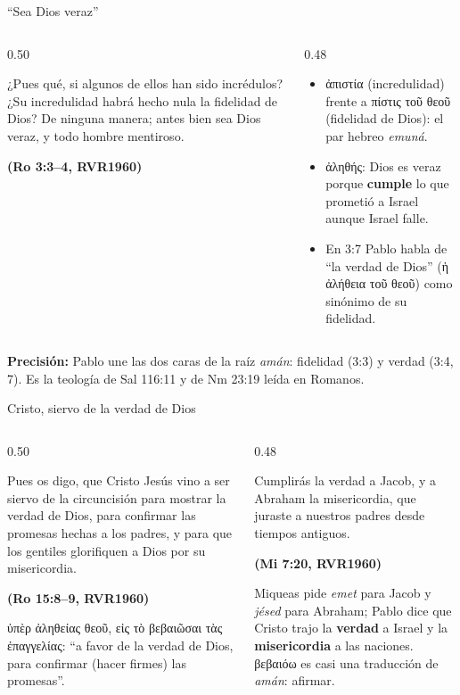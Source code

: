 \documentclass[hyperref={bookmarks=false},aspectratio=169]{beamer}
\newcommand{\grc}[1]{\foreignlanguage{ancientgreek}{#1}}
\newcommand{\fuente}[1]{\par\hfill{\upshape\bfseries\footnotesize\textcolor{azul}{#1}}}
\newcommand{\destacar}[1]{\textbf{\textcolor{azul}{#1}}}
\newcommand{\precision}[1]{{\footnotesize\color{gris}\textbf{Precisión:} #1}}
\begin{document}
\begin{frame}{``Sea Dios veraz''}
\begin{columns}[t,onlytextwidth]
\begin{column}{0.50\textwidth}
\begin{cita}¿Pues qué, si algunos de ellos han sido incrédulos? ¿Su incredulidad habrá hecho nula la fidelidad de Dios? De ninguna manera; antes bien sea Dios veraz, y todo hombre mentiroso.\fuente{(Ro 3:3--4, RVR1960)}\end{cita}
\end{column}
\begin{column}{0.48\textwidth}\small
\begin{itemize}
\item \grc{ἀπιστία} (incredulidad) frente a \grc{πίστις τοῦ θεοῦ} (fidelidad de Dios): el par hebreo \emph{emuná}.
\item \grc{ἀληθής}: Dios es veraz porque \destacar{cumple} lo que prometió a Israel aunque Israel falle.
\item En 3:7 Pablo habla de ``la verdad de Dios'' (\grc{ἡ ἀλήθεια τοῦ θεοῦ}) como sinónimo de su fidelidad.
\end{itemize}
\end{column}
\end{columns}\par\smallskip
\precision{Pablo une las dos caras de la raíz \emph{amán}: fidelidad (3:3) y verdad (3:4, 7). Es la teología de Sal 116:11 y de Nm 23:19 leída en Romanos.}
\end{frame}

\begin{frame}{Cristo, siervo de la verdad de Dios}
\begin{columns}[t,onlytextwidth]
\begin{column}{0.50\textwidth}
\begin{cita}Pues os digo, que Cristo Jesús vino a ser siervo de la circuncisión para mostrar la verdad de Dios, para confirmar las promesas hechas a los padres, y para que los gentiles glorifiquen a Dios por su misericordia.\fuente{(Ro 15:8--9, RVR1960)}\end{cita}
\scriptsize\grc{ὑπὲρ ἀληθείας θεοῦ, εἰς τὸ βεβαιῶσαι τὰς ἐπαγγελίας}: ``a favor de la verdad de Dios, para confirmar (hacer firmes) las promesas''.
\end{column}
\begin{column}{0.48\textwidth}
\begin{cita}Cumplirás la verdad a Jacob, y a Abraham la misericordia, que juraste a nuestros padres desde tiempos antiguos.\fuente{(Mi 7:20, RVR1960)}\end{cita}
\small Miqueas pide \emph{emet} para Jacob y \emph{jésed} para Abraham; Pablo dice que Cristo trajo la \destacar{verdad} a Israel y la \destacar{misericordia} a las naciones. \grc{βεβαιόω} es casi una traducción de \emph{amán}: afirmar.
\end{column}
\end{columns}
\end{frame}
\end{document}
